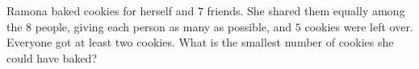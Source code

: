 Ramona baked cookies for herself and $7$ friends. She shared them equally among the $8$ people, giving each person as many as possible, and $5$ cookies were left over. Everyone got at least two cookies. What is the smallest number of cookies she could have baked?
